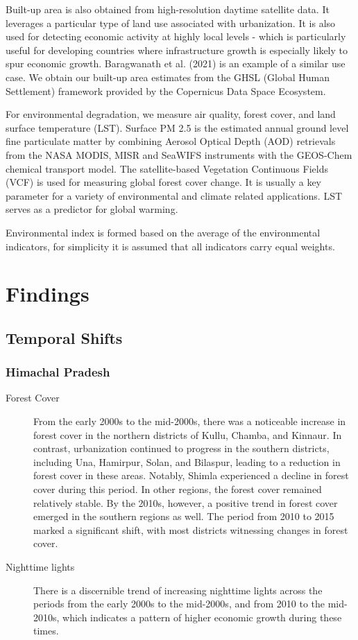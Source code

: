\documentclass[doublespace,times,Afour,review]{template/sagej}
\begin{document}
Built-up area is also obtained from high-resolution daytime satellite data. It leverages a particular type of land use associated with urbanization. It is also used for detecting economic activity at highly local levels - which is particularly useful for developing countries where infrastructure growth is especially likely to spur economic growth. Baragwanath et al. (2021) is an example of a similar use case. We obtain our built-up area estimates from the GHSL (Global Human Settlement) framework provided by the Copernicus Data Space Ecosystem. 

For environmental degradation, we measure air quality, forest cover, and land surface temperature (LST). Surface PM 2.5 is the estimated annual ground level fine particulate matter by combining Aerosol Optical Depth (AOD) retrievals from the NASA MODIS, MISR and SeaWIFS instruments with the GEOS-Chem chemical transport model. The satellite-based Vegetation Continuous Fields (VCF) is used for measuring global forest cover change. It is usually a key parameter for a variety of environmental and climate related applications. LST serves as a predictor for global warming. 

Environmental index is formed based on the average of the environmental indicators, for simplicity it is assumed that all indicators carry equal weights.



\section{Findings}

\subsection{Temporal Shifts}

\subsubsection*{Himachal Pradesh}

\begin{description}
    \item[Forest Cover] From the early 2000s to the mid-2000s, there was a noticeable increase in forest cover in the northern districts of Kullu, Chamba, and Kinnaur. In contrast, urbanization continued to progress in the southern districts, including Una, Hamirpur, Solan, and Bilaspur, leading to a reduction in forest cover in these areas. Notably, Shimla experienced a decline in forest cover during this period. In other regions, the forest cover remained relatively stable. By the 2010s, however, a positive trend in forest cover emerged in the southern regions as well. The period from 2010 to 2015 marked a significant shift, with most districts witnessing changes in forest cover.
    \item[Nighttime lights] There is a discernible trend of increasing nighttime lights across the periods from the early 2000s to the mid-2000s, and from 2010 to the mid-2010s, which indicates a pattern of higher economic growth during these times.

\end{description}
\end{document}
